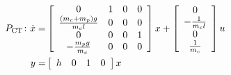 \begin{subequations}\label{eqn:EoMPendulumCT_ss}
\begin{align}
P_{\rm{CT}}\colon \dot{x}
= & \left[
\begin{array}{cccc}
    0 & 1 & 0 & 0 \\
    \frac{(m_c + m_p) g}{m_c l} & 0 & 0 & 0 \\
    0 & 0 & 0 & 1 \\
    -\frac{m_p g}{m_c}  & 0 & 0 & 0 
\end{array}\right]
x +
\left[
\begin{array}{c}
    0 \\ -\frac{1}{m_c l} \\ 0 \\ \frac{1}{m_c}\\
\end{array}\right] u \\
y = & 
\left[
\begin{array}{cccc}
    h & 0 & 1 & 0 \\
\end{array}\right]
x
\end{align}
\end{subequations}

